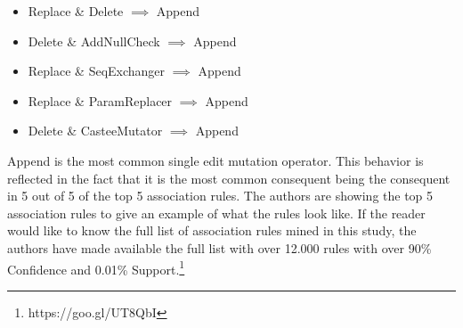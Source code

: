 \documentclass[conference]{IEEEtran}
\begin{document}
\begin{itemize}
\item Replace \& Delete $\implies$ Append
\item Delete \& AddNullCheck $\implies$ Append
\item Replace \& SeqExchanger $\implies$ Append
\item Replace \& ParamReplacer $\implies$ Append
\item Delete \& CasteeMutator $\implies$ Append
\end{itemize}

Append is the most common single edit mutation operator. This behavior is reflected in the fact that it is the most common consequent being the consequent in 5 out of 5 of the top 5 association rules. The authors are showing the top 5 association rules to give an example of what the rules look like. If the reader would like to know the full list of association rules mined in this study, the authors have made available the full list with over 12.000 rules with over 90\% Confidence and 0.01\% Support.\footnote{https://goo.gl/UT8QbI}
\end{document}
